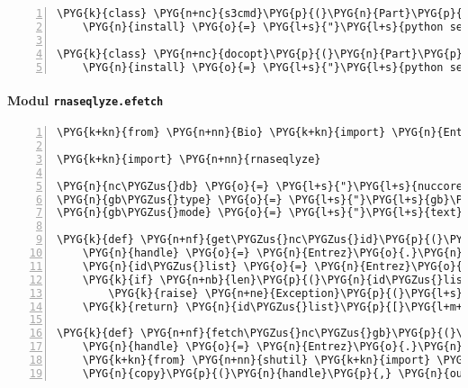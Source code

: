\begin{Verbatim}[commandchars=\\\{\},numbers=left,firstnumber=1,stepnumber=5]
\PYG{k}{class} \PYG{n+nc}{s3cmd}\PYG{p}{(}\PYG{n}{Part}\PYG{p}{)}\PYG{p}{:}
    \PYG{n}{install} \PYG{o}{=} \PYG{l+s}{"}\PYG{l+s}{python setup.py install --prefix=\PYGZdl{}PREFIX}\PYG{l+s}{"}

\PYG{k}{class} \PYG{n+nc}{docopt}\PYG{p}{(}\PYG{n}{Part}\PYG{p}{)}\PYG{p}{:}
    \PYG{n}{install} \PYG{o}{=} \PYG{l+s}{"}\PYG{l+s}{python setup.py install --prefix=\PYGZdl{}PREFIX}\PYG{l+s}{"}
\end{Verbatim}


\paragraph{Modul \texttt{rnaseqlyze.efetch}}
\label{rnaseqlyze-pdf:modul-rnaseqlyze-efetch}
\begin{Verbatim}[commandchars=\\\{\},numbers=left,firstnumber=1,stepnumber=5]
\PYG{k+kn}{from} \PYG{n+nn}{Bio} \PYG{k+kn}{import} \PYG{n}{Entrez}

\PYG{k+kn}{import} \PYG{n+nn}{rnaseqlyze}

\PYG{n}{nc\PYGZus{}db} \PYG{o}{=} \PYG{l+s}{"}\PYG{l+s}{nuccore}\PYG{l+s}{"}
\PYG{n}{gb\PYGZus{}type} \PYG{o}{=} \PYG{l+s}{"}\PYG{l+s}{gb}\PYG{l+s}{"}
\PYG{n}{gb\PYGZus{}mode} \PYG{o}{=} \PYG{l+s}{"}\PYG{l+s}{text}\PYG{l+s}{"}

\PYG{k}{def} \PYG{n+nf}{get\PYGZus{}nc\PYGZus{}id}\PYG{p}{(}\PYG{n}{accession}\PYG{p}{)}\PYG{p}{:}
    \PYG{n}{handle} \PYG{o}{=} \PYG{n}{Entrez}\PYG{o}{.}\PYG{n}{esearch}\PYG{p}{(}\PYG{n}{db}\PYG{o}{=}\PYG{n}{nc\PYGZus{}db}\PYG{p}{,} \PYG{n}{term}\PYG{o}{=}\PYG{n}{accession} \PYG{o}{+} \PYG{l+s}{"}\PYG{l+s}{[Accession]}\PYG{l+s}{"}\PYG{p}{)}
    \PYG{n}{id\PYGZus{}list} \PYG{o}{=} \PYG{n}{Entrez}\PYG{o}{.}\PYG{n}{read}\PYG{p}{(}\PYG{n}{handle}\PYG{p}{)}\PYG{p}{[}\PYG{l+s}{"}\PYG{l+s}{IdList}\PYG{l+s}{"}\PYG{p}{]}
    \PYG{k}{if} \PYG{n+nb}{len}\PYG{p}{(}\PYG{n}{id\PYGZus{}list}\PYG{p}{)} \PYG{o}{!=} \PYG{l+m+mi}{1}\PYG{p}{:}
        \PYG{k}{raise} \PYG{n+ne}{Exception}\PYG{p}{(}\PYG{l+s}{"}\PYG{l+s}{unexpected reply from Entrez: id\PYGZus{}list: }\PYG{l+s+si}{\PYGZpc{}s}\PYG{l+s}{"} \PYG{o}{\PYGZpc{}} \PYG{n}{id\PYGZus{}list}\PYG{p}{)}
    \PYG{k}{return} \PYG{n}{id\PYGZus{}list}\PYG{p}{[}\PYG{l+m+mi}{0}\PYG{p}{]}

\PYG{k}{def} \PYG{n+nf}{fetch\PYGZus{}nc\PYGZus{}gb}\PYG{p}{(}\PYG{n}{gb\PYGZus{}id}\PYG{p}{,} \PYG{n}{out\PYGZus{}file}\PYG{p}{)}\PYG{p}{:}
    \PYG{n}{handle} \PYG{o}{=} \PYG{n}{Entrez}\PYG{o}{.}\PYG{n}{efetch}\PYG{p}{(}\PYG{n}{db}\PYG{o}{=}\PYG{n}{nc\PYGZus{}db}\PYG{p}{,} \PYG{n+nb}{id}\PYG{o}{=}\PYG{n}{gb\PYGZus{}id}\PYG{p}{,} \PYG{n}{rettype}\PYG{o}{=}\PYG{n}{gb\PYGZus{}type}\PYG{p}{,} \PYG{n}{retmode}\PYG{o}{=}\PYG{n}{gb\PYGZus{}mode}\PYG{p}{)}
    \PYG{k+kn}{from} \PYG{n+nn}{shutil} \PYG{k+kn}{import} \PYG{n}{copyfileobj} \PYG{k}{as} \PYG{n}{copy}
    \PYG{n}{copy}\PYG{p}{(}\PYG{n}{handle}\PYG{p}{,} \PYG{n}{out\PYGZus{}file}\PYG{p}{)}
\end{Verbatim}


